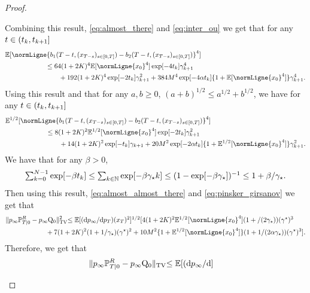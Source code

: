 \begin{proof}
\begin{enumerate}[wide, labelwidth=!, labelindent=0pt, label=(\alph*)]
Combining this result, \eqref{eq:almost_there} and \eqref{eq:inter_ou} we get that for any $t \in \left(t_k, t_{k+1}\right]$
\begin{align}
  &\expeLigne{\normLigne{b_1(T-t, (x_{T-s})_{s \in \ccint{0,T}})  - b_2(T-t, (x_{T-s})_{s \in \ccint{0,T}})}^4} \\
  & \qquad \qquad \qquad \leq 64(1 + 2 \Ktt)^4\expeLigne{\normLigne{x_0}^4}\exp[-4t_k]\gamma_{k+1}^4  \\
  &\qquad \qquad \qquad \qquad   + 192 (1 + 2 \Ktt)^4 \exp[-2t_k]\gamma_{k+1}^2 + 384 \Mtt^4 \exp[-4\alpha t_k] \{1 + \expeLigne{\normLigne{x_0}^4}\} \gamma_{k+1}^4  . 
\end{align}
Using this result and that for any $a,b \geq 0$,
$(a+b)^{1/2} \leq a^{1/2} + b^{1/2}$, we have for any $t \in \left(t_k,t_{k+1}\right]$
\begin{align}
  &\expeLignesqrt{\normLigne{b_1(T-t, (x_{T-s})_{s \in \ccint{0,T}})  - b_2(T-t, (x_{T-s})_{s \in \ccint{0,T}})}^4} \\
  & \qquad \qquad \qquad \leq 8(1 + 2 \Ktt)^2\expeLignesqrt{\normLigne{x_0}^4}\exp[-2t_k]\gamma_{k+1}^2  \\
  &\qquad \qquad \qquad  \qquad + 14 (1 + 2 \Ktt)^2 \exp[-t_k]\gamma_{k+1} + 20 \Mtt^2 \exp[-2\alpha t_k] \{1 + \expeLignesqrt{\normLigne{x_0}^4}\} \gamma_{k+1}^2  . \label{eq:almost_almost_there}
\end{align}
We have that for any $\beta >0$,
\begin{equation}
  \textstyle{
 \sum_{k=0}^{N-1} \exp[-\beta t_k] \leq \sum_{k \in \mathbb{N}} \exp[-\beta
 \gamma_\star k] \leq (1 - \exp[-\beta \gamma_\star])^{-1} \leq 1 + \beta / \gamma_\star  .
 }
\end{equation}
Then using this result, \eqref{eq:almost_almost_there} and \eqref{eq:pinsker_girsanov} we get that
\begin{align}
        &\tvnormLigne{p_\infty \Pbb^R_{T|0} - p_\infty \Qker_0}^2  \textstyle{\leq  \expeLigne{(\rmd p_\infty / \rmd
                                                                        p_T)(x_T)^2}^{1/2}} [4(1 + 2 \Ktt)^2\expeLignesqrt{\normLigne{x_0}^4}(1 +/(2\gamma_\star))(\gamma^\star)^3  \\
  &\qquad \qquad \qquad + 7 (1 + 2 \Ktt)^2 (1 +1/\gamma_\star)(\gamma^\star)^2 + 10 \Mtt^2 \{1 + \expeLignesqrt{\normLigne{x_0}^4}\} (1 +1/(2 \alpha\gamma_\star))  (\gamma^\star)^3]  . 
\end{align}
Therefore, we get that
\begin{align}
        &\| p_\infty \mathbb{P}^R_{T|0} - p_\infty \mathrm{Q}_0 \|_{\mathrm{TV}}  \textstyle{\leq  \mathbb{E}[ (\mathrm{d}p_\infty / \mathrm{d}]}
\end{align}
\end{enumerate}
\end{proof}
